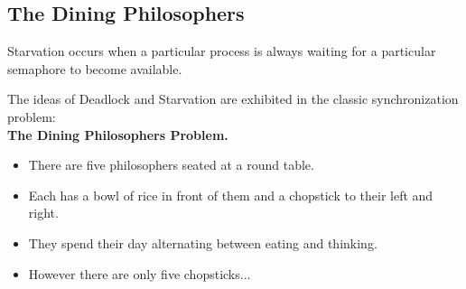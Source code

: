 \documentclass[a4paper, 10pt]{article}
\begin{document}
\subsection{The Dining Philosophers}
\begin{definitionbox}{}{}
    Starvation occurs when a particular process is always waiting for a particular semaphore to become available.
\end{definitionbox}
\noindent The ideas of Deadlock and Starvation are exhibited in the classic synchronization problem: \\
\textbf{The Dining Philosophers Problem.}
\begin{itemize}
    \item There are five philosophers seated at a round table.
    \item Each has a bowl of rice in front of them and a chopstick to their left and right.
    \item They spend their day alternating between eating and thinking.
    \item However there are only five chopsticks...
\end{itemize}
\end{document}

